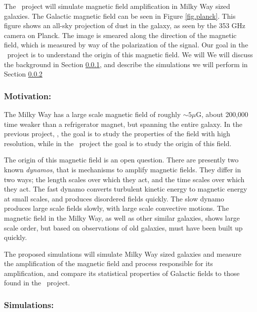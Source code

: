 The \nameGalaxies\ project will simulate magnetic field amplification in Milky
Way sized galaxies.
The Galactic magnetic field can be seen in Figure \ref{fig.planck}.  This figure
shows an all-sky projection of dust in the galaxy, as seen by the 353 GHz camera
on Planck.  The image is smeared along the direction of
the magnetic field, which is measured by way of the polarization of the signal.  Our goal in the \nameGalaxies\ project is to understand the
origin of this magnetic field.   We will We will discuss the background in Section
\ref{subsec.galaxies_motivate}, and describe the simulations we will perform in
Section \ref{subsec.galaxies_sims}

\subsubsection{Motivation: \nameGalaxies}
\label{subsec.galaxies_motivate}

The Milky Way has a large scale magnetic
field of roughly $\sim 5 \mu$G, about 200,000 time weaker than a refrigerator
magnet, but spanning the entire galaxy.   In the previous project, \nameCMB, the
goal is to study the properties of the field with high resolution, while in
the \nameGalaxies\ project the goal is to study the origin of this field.

The origin of this magnetic field is an open question.  There are presently two
known \emph{dynamos}, that is mechanisms to amplify magnetic fields. They differ in
two ways; the length scales over which they act, and the time scales over which
they act.  The fast
dynamo converts turbulent kinetic energy to magnetic energy at small scales, and
produces disordered fields quickly.  The slow dynamo produces large scale fields
slowly, with large scale convective motions. The magnetic field in the Milky Way, as well as other similar galaxies,
shows large scale order, but based on observations of old galaxies, must have been
built up quickly. 

The proposed simulations will simulate Milky Way sized galaxies and measure the
amplification of the magnetic field and process responsible for its amplification, and compare its
statistical properties of Galactic fields to those found in the \nameCMB\
project.

\subsubsection{Simulations: \nameGalaxies}
\label{subsec.galaxies_sims}

